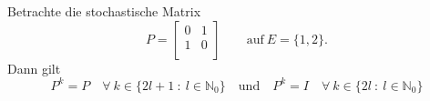 Betrachte die stochastische Matrix
\begin{equation*}
P=
\begin{bmatrix}
0 & 1 \\
1  & 0 \\
\end{bmatrix}
\qquad
\mathrm{auf \:} E = \lbrace 1,2 \rbrace.
\end{equation*}
Dann gilt
\begin{equation*}
P^{k} = P \quad \forall \: k \in \lbrace 2l +1 \: : \: l \in \mathbb{N}_{0}  \rbrace \quad \mathrm{und} \quad P^{k} = I \quad \forall \: k \in \lbrace 2l \: : \: l \in \mathbb{N}_{0} \rbrace
\end{equation*}